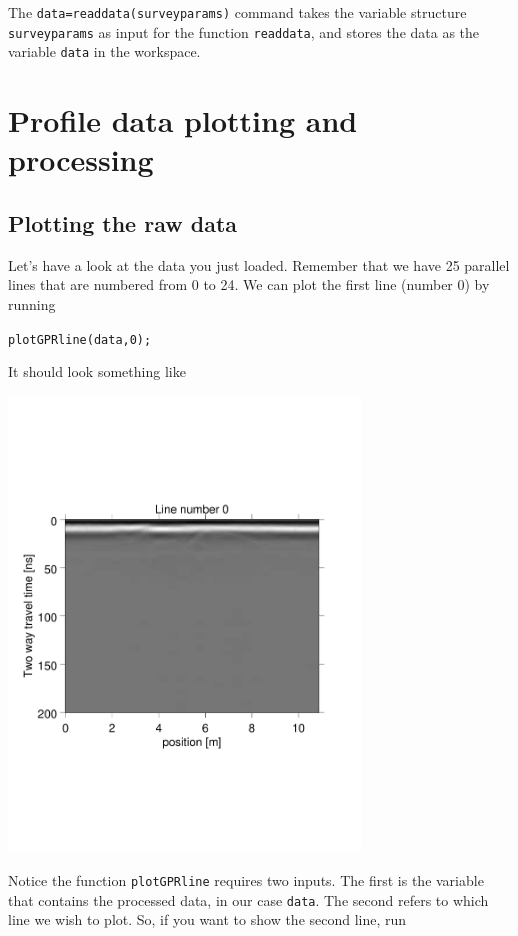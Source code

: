 \documentclass[11pt]{article}
\begin{document}
The \verb#data=readdata(surveyparams)# command takes the variable structure
\verb#surveyparams# as input for the function \verb#readdata#, and stores the 
data as the variable \verb#data# in the workspace.

\section{Profile data plotting and processing}\label{secProfiles}

\subsection{Plotting the raw data}

Let's have a look at the data you just loaded. Remember that we have
25 parallel lines that are numbered from 0 to 24. We can plot the
first line (number 0) by running

\qquad \verb#plotGPRline(data,0);#

\clearpage
It should look something like
\begin{center}
\includegraphics[width=0.7\textwidth, trim = 0.9cm 6cm 2cm
  6.5cm,clip]{figures/GPRline0}
\end{center}

Notice the function \verb#plotGPRline# requires two inputs. The first
is the variable that contains the processed data, in our case \verb#data#.
The second refers to which line we wish to plot. So, if you want to show the second line, run
\end{document}
